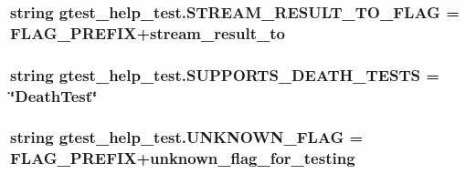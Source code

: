 \subsubsection[{\texorpdfstring{S\+T\+R\+E\+A\+M\+\_\+\+R\+E\+S\+U\+L\+T\+\_\+\+T\+O\+\_\+\+F\+L\+AG}{STREAM_RESULT_TO_FLAG}}]{\setlength{\rightskip}{0pt plus 5cm}string gtest\+\_\+help\+\_\+test.\+S\+T\+R\+E\+A\+M\+\_\+\+R\+E\+S\+U\+L\+T\+\_\+\+T\+O\+\_\+\+F\+L\+AG = {\bf F\+L\+A\+G\+\_\+\+P\+R\+E\+F\+IX}+\textquotesingle{}stream\+\_\+result\+\_\+to\textquotesingle{}}\hypertarget{namespacegtest__help__test_a06d67cce3cb57c484c169d1dbe4afd6c}{}\label{namespacegtest__help__test_a06d67cce3cb57c484c169d1dbe4afd6c}
\subsubsection[{\texorpdfstring{S\+U\+P\+P\+O\+R\+T\+S\+\_\+\+D\+E\+A\+T\+H\+\_\+\+T\+E\+S\+TS}{SUPPORTS_DEATH_TESTS}}]{\setlength{\rightskip}{0pt plus 5cm}string gtest\+\_\+help\+\_\+test.\+S\+U\+P\+P\+O\+R\+T\+S\+\_\+\+D\+E\+A\+T\+H\+\_\+\+T\+E\+S\+TS = \char`\"{}Death\+Test\char`\"{}}\hypertarget{namespacegtest__help__test_a70c7e8b24ce75dfa26ff540b861cdc54}{}\label{namespacegtest__help__test_a70c7e8b24ce75dfa26ff540b861cdc54}
\subsubsection[{\texorpdfstring{U\+N\+K\+N\+O\+W\+N\+\_\+\+F\+L\+AG}{UNKNOWN_FLAG}}]{\setlength{\rightskip}{0pt plus 5cm}string gtest\+\_\+help\+\_\+test.\+U\+N\+K\+N\+O\+W\+N\+\_\+\+F\+L\+AG = {\bf F\+L\+A\+G\+\_\+\+P\+R\+E\+F\+IX}+\textquotesingle{}unknown\+\_\+flag\+\_\+for\+\_\+testing\textquotesingle{}}\hypertarget{namespacegtest__help__test_a400934cf13530098af31e2a65f1a8d84}{}\label{namespacegtest__help__test_a400934cf13530098af31e2a65f1a8d84}
